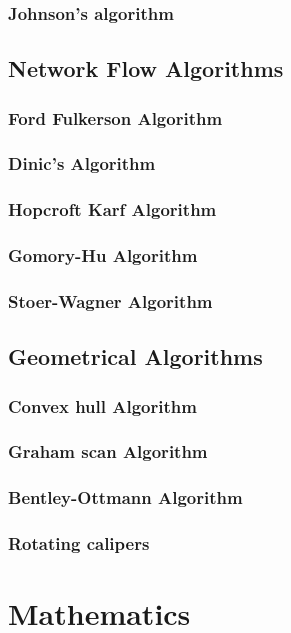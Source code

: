 \documentclass[10pt,landscape,twocolumn]{article}
\begin{document}
\subsubsection{Johnson's algorithm}


\subsection{Network Flow Algorithms}
\subsubsection{Ford Fulkerson Algorithm}
\subsubsection{Dinic's Algorithm}
\subsubsection{Hopcroft Karf Algorithm}
\subsubsection{Gomory-Hu Algorithm}
\subsubsection{Stoer-Wagner Algorithm}

\subsection{Geometrical Algorithms}
\subsubsection{Convex hull Algorithm}
\subsubsection{Graham scan Algorithm}
\subsubsection{Bentley-Ottmann Algorithm}
\subsubsection{Rotating calipers}

\section{Mathematics}
\end{document}

